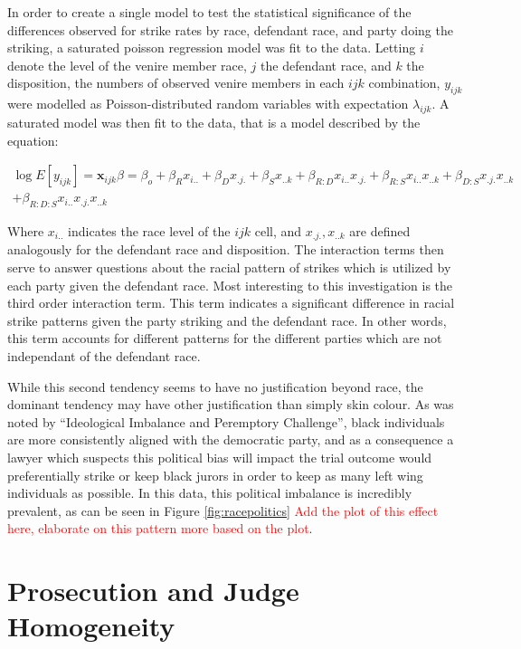 In order to create a single model to test the statistical significance of the differences observed for strike rates by race,
defendant race, and party doing the striking, a saturated poisson regression model was fit to the data. Letting $i$ denote the
level of the venire member race, $j$ the defendant race, and $k$ the disposition, the numbers of observed venire members in each
$ijk$ combination, $y_{ijk}$ were modelled as Poisson-distributed random variables with expectation $\lambda_{ijk}$. A saturated
model was then fit to the data, that is a model described by the equation:

\begin{multline}
  \log{E[y_{ijk}]} = \textbf{x}_{ijk}\beta = \beta_o + \beta_R x_{i..}  + \beta_{D} x_{.j.} + \beta_S x_{..k} +\beta_{R:D}x_{i..}
  x_{.j.} + \beta_{R:S} x_{i..} x_{..k} +\beta_{D:S} x_{.j.}x_{..k} \\+ \beta_{R:D:S} x_{i..} x_{.j.} x_{..k}
\end{multline}

Where $x_{i..}$ indicates the race level of the $ijk$ cell, and $x_{.j.},x_{..k}$ are defined analogously for the defendant race
and disposition. The interaction terms then serve to answer questions about the racial pattern of strikes which is utilized by
each party given the defendant race. Most interesting to this investigation is the third order interaction term. This term
indicates a significant difference in racial strike patterns given the party striking and the defendant race. In other words, this
term accounts for different patterns for the different parties which are not independant of the defendant race.

While this second tendency seems to have no justification beyond race, the dominant tendency may have other justification than
simply skin colour. As was noted by ``Ideological Imbalance and Peremptory Challenge'', black individuals are more consistently
aligned with the democratic party, and as a consequence a lawyer which suspects this political bias will impact the trial outcome
would preferentially strike or keep black jurors in order to keep as many left wing individuals as possible. In this data, this
political imbalance is incredibly prevalent, as can be seen in Figure \ref{fig:racepolitics} \textcolor{red}{Add the plot of this
  effect here, elaborate on this pattern more based on the plot}.

\section{Prosecution and Judge Homogeneity} \label{sec:causepro}

